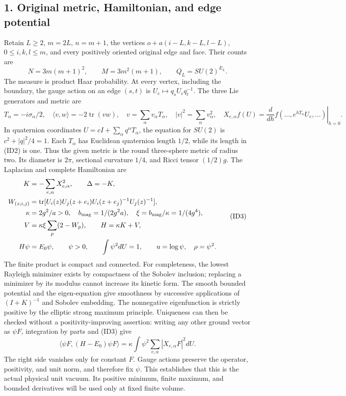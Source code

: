 \documentclass[11pt]{article}
\begin{document}
\subsection*{1. Original metric, Hamiltonian, and edge potential}

Retain \(L\ge2\), \(m=2L\), \(n=m+1\), the vertices \(o+a(i-L,k-L,l-L)\), \(0\le i,k,l\le m\), and every positively oriented original edge and face. Their counts are
\[
 N=3m(m+1)^2,\qquad M=3m^2(m+1),\qquad Q_L=SU(2)^{E_L}.
 \tag{ID1}
\]
The measure is product Haar probability. At every vertex, including the boundary, the gauge action on an edge \((s,t)\) is \(U_e\mapsto q_sU_eq_t^{-1}\). The three Lie generators and metric are
\[
 T_\alpha=-i\sigma_\alpha/2,\quad
 \langle v,w\rangle=-2\operatorname{tr}(vw),\quad
 v=\sum_\alpha v_\alpha T_\alpha,\quad |v|^2=\sum_\alpha v_\alpha^2,
 \quad X_{e,\alpha}f(U)=\left.\frac d{dh}f(\ldots,e^{hT_\alpha}U_e,\ldots)\right|_{h=0}.
 \tag{ID2}
\]
In quaternion coordinates \(U=cI+\sum_\alpha q^\alpha T_\alpha\), the equation for \(SU(2)\) is \(c^2+|q|^2/4=1\). Each \(T_\alpha\) has Euclidean quaternion length \(1/2\), while its length in (ID2) is one. Thus the given metric is the round three-sphere metric of radius two. Its diameter is \(2\pi\), sectional curvature \(1/4\), and Ricci tensor \((1/2)g\). The Laplacian and complete Hamiltonian are
\[
 \begin{aligned}
 K&=-\sum_{e,\alpha}X_{e,\alpha}^2,\qquad \Delta=-K,\\
 W_{(z;i,j)}&=\operatorname{tr}[U_i(z)U_j(z+e_i)U_i(z+e_j)^{-1}U_j(z)^{-1}],\\
 \kappa&=2g^2/a>0,\quad b_{\rm mag}=1/(2g^2a),\quad\xi=b_{\rm mag}/\kappa=1/(4g^4),\\
 V&=\kappa\xi\sum_p(2-W_p),\qquad H=\kappa K+V,\\
 H\psi&=E_0\psi,\qquad \psi>0,\qquad \int\psi^2dU=1,\qquad u=\log\psi,\quad\rho=\psi^2.
 \end{aligned}\tag{ID3}
\]
The finite product is compact and connected. For completeness, the lowest Rayleigh minimizer exists by compactness of the Sobolev inclusion; replacing a minimizer by its modulus cannot increase its kinetic form. The smooth bounded potential and the eigen-equation give smoothness by successive applications of \((I+K)^{-1}\) and Sobolev embedding. The nonnegative eigenfunction is strictly positive by the elliptic strong maximum principle. Uniqueness can then be checked without a positivity-improving assertion: writing any other ground vector as \(\psi F\), integration by parts and (ID3) give
\[
 \langle\psi F,(H-E_0)\psi F\rangle
       =\kappa\int\psi^2\sum_{e,\alpha}|X_{e,\alpha}F|^2dU.
 \tag{ID4}
\]
The right side vanishes only for constant \(F\). Gauge actions preserve the operator, positivity, and unit norm, and therefore fix \(\psi\). This establishes that this is the actual physical unit vacuum. Its positive minimum, finite maximum, and bounded derivatives will be used only at fixed finite volume.
\end{document}
